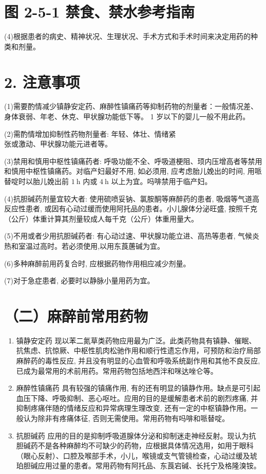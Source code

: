 \documentclass[10pt]{article}
\begin{document}
\section*{图 2-5-1 禁食、禁水参考指南}
(4)根据患者的病史、精神状况、生理状况、手术方式和手术时间来决定用药的种类和剂量。

\section*{2. 注意事项}
(1)需要酌情减少镇静安定药、麻醉性镇痛药等抑制药物的剂量者：一般情况差、身体衰弱、年老、休克、甲状腺功能低下等。 1 岁以下的婴儿一般不用此药。

(2)需酌情增加抑制性药物剂量者: 年轻、体壮、情绪紧\\
张或激动、甲状腺功能元进者等。

(3)禁用和慎用中枢性镇痛药者: 呼吸功能不全、呼吸道梗阻、顼内压增高者等禁用和慎用中枢性镇痛药。对临产妇最好不用, 如必须用, 应考虑胎儿娩出的时间, 用哌替啶时以胎儿娩出前 $1 \mathrm{~h}$ 内或 $4 \mathrm{~h}$ 以上为宜。吗啡禁用于临产妇。

(4)抗胆碱药剂量宜较大者: 使用硫喷妥钠、氯胺酮等麻醉药的患者, 吸烟等气道高反应性患者, 或因有心动过缓而使用阿托品的患者。小儿腺体分泌旺盛, 按照千克（公斤）体重计算其剂量较成人每千克（公斤）体重用量大。

(5)不用或者少用抗胆碱药者: 有心动过速、甲状腺功能立进、高热等患者, 气候炎热和室温过高时。若必须使用,以用东莨蓎碱为宜。

(6)多种麻醉前用药复合时, 应根据药物作用相应减少剂量。

(7)对于急症患者, 必要时以静脉小量用药为宜。

\section*{（二）麻醉前常用药物}
\begin{enumerate}
  \item 镇静安定药 现以苯二氮草类药物应用最为广泛。此类药物具有镇静、催眠、抗焦虑、抗惊厥、中枢性肌肉松驰作用和顺行性遗忘作用，可预防和治疗局部麻醉药的毒性反应, 并且没有明显的心血管和呼吸系统副作用和其他不良反应, 已成为最常用的术前用药。常用药物包括地西泮和咪达唑仑等。

  \item 麻醉性镇痛药 具有较强的镇痛作用, 有的还有明显的镇静作用。缺点是可引起血压下降、呼吸抑制、恶心呕吐。应用的目的是缓解患者术前的剧烈疼痛, 并抑制疼痛伴随的情绪反应和异常病理生理改变, 还有一定的中枢镇静作用。一般认为除非有疼痛体征, 否则无需使用。常用药物有吗啡和哌替啶。

  \item 抗胆碱药 应用的目的是抑制呼吸道腺体分泌和抑制迷走神经反射。现认为抗胆碱药不是各种麻醉均不可缺少的药物，应根据具体情况选用，如用于眼科（眼心反射）、口腔及喉部手术，小儿，喉镜或支气管镜检查，心动过缓及琥珀胆碱应用过量的患者。常用药物有阿托品、东莨宕碱、长托宁及格隆溴铵。

\end{enumerate}
\end{document}

